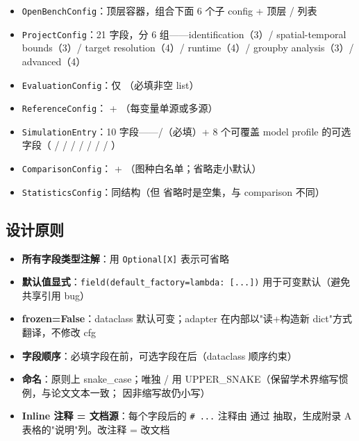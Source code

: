 \begin{itemize}
  \item \texttt{OpenBenchConfig}：顶层容器，组合下面 6 个子 config + 顶层  /  列表
  \item \texttt{ProjectConfig}：21 字段，分 6 组——identification（3）/ spatial-temporal bounds（3）/ target resolution（4）/ runtime（4）/ groupby analysis（3）/ advanced（4）
  \item \texttt{EvaluationConfig}：仅 （必填非空 list）
  \item \texttt{ReferenceConfig}： + （每变量单源或多源）
  \item \texttt{SimulationEntry}：10 字段——/（必填）+ 8 个可覆盖 model profile 的可选字段（ /  /  /  /  /  /  / ）
  \item \texttt{ComparisonConfig}： + （图种白名单；省略走小默认）
  \item \texttt{StatisticsConfig}：同结构（但  省略时是空集，与 comparison 不同）
\end{itemize}

\subsection{设计原则}

\begin{itemize}
  \item \textbf{所有字段类型注解}：用 \texttt{Optional[X]} 表示可省略
  \item \textbf{默认值显式}：\texttt{field(default\_factory=lambda: [...])} 用于可变默认（避免共享引用 bug）
  \item \textbf{frozen=False}：dataclass 默认可变；adapter 在内部以"读+构造新 dict"方式翻译，不修改 cfg
  \item \textbf{字段顺序}：必填字段在前，可选字段在后（dataclass 顺序约束）
  \item \textbf{命名}：原则上 snake\_case；唯独  /  用 UPPER\_SNAKE（保留学术界缩写惯例，与论文文本一致； 因非缩写故仍小写）
  \item \textbf{Inline 注释 = 文档源}：每个字段后的 \texttt{\# ...} 注释由  通过  抽取，生成附录 A 表格的"说明"列。改注释 = 改文档
\end{itemize}

